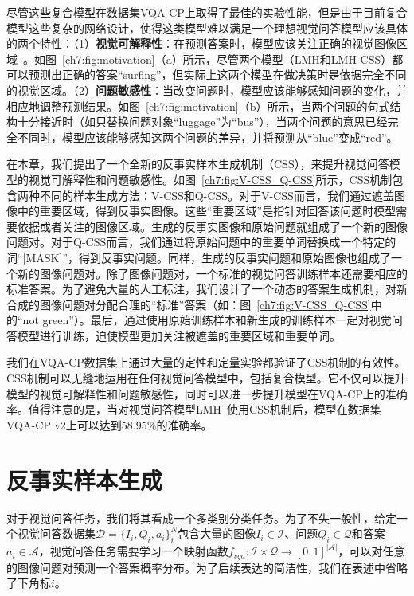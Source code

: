 尽管这些复合模型在数据集VQA-CP上取得了最佳的实验性能，但是由于目前复合模型这些复杂的网络设计，使得这类模型难以满足一个理想视觉问答模型应该具体的两个特性：（1）\textbf{视觉可解释性}：在预测答案时，模型应该关注正确的视觉图像区域~\cite{ross2017right}。如图~\ref{ch7:fig:motivation}（a）所示，尽管两个模型（LMH和LMH-CSS）都可以预测出正确的答案“surfing”，但实际上这两个模型在做决策时是依据完全不同的视觉区域。（2）\textbf{问题敏感性}：当改变问题时，模型应该能够感知问题的变化，并相应地调整预测结果。如图~\ref{ch7:fig:motivation}（b）所示，当两个问题的句式结构十分接近时（如只替换问题对象“luggage”为“bus”），当两个问题的意思已经完全不同时，模型应该能够感知这两个问题的差异，并将预测从“blue”变成“red”。

在本章，我们提出了一个全新的反事实样本生成机制（CSS），来提升视觉问答模型的视觉可解释性和问题敏感性。如图~\ref{ch7:fig:V-CSS_Q-CSS}所示，CSS机制包含两种不同的样本生成方法：V-CSS和Q-CSS。对于V-CSS而言，我们通过遮盖图像中的重要区域，得到反事实图像。这些“重要区域”是指针对回答该问题时模型需要依据或者关注的图像区域。生成的反事实图像和原始问题就组成了一个新的图像问题对。对于Q-CSS而言，我们通过将原始问题中的重要单词替换成一个特定的词“[MASK]”，得到反事实问题。同样，生成的反事实问题和原始图像也组成了一个新的图像问题对。除了图像问题对，一个标准的视觉问答训练样本还需要相应的标准答案。为了避免大量的人工标注，我们设计了一个动态的答案生成机制，对新合成的图像问题对分配合理的“标准”答案（如：图~\ref{ch7:fig:V-CSS_Q-CSS}中的“not green”）。最后，通过使用原始训练样本和新生成的训练样本一起对视觉问答模型进行训练，迫使模型更加关注被遮盖的重要区域和重要单词。

我们在VQA-CP数据集上通过大量的定性和定量实验都验证了CSS机制的有效性。CSS机制可以无缝地运用在任何视觉问答模型中，包括复合模型。它不仅可以提升模型的视觉可解释性和问题敏感性，同时可以进一步提升模型在VQA-CP上的准确率。值得注意的是，当对视觉问答模型LMH~\cite{clark2019don}使用CSS机制后，模型在数据集VQA-CP v2上可以达到58.95\%的准确率。


\section{反事实样本生成}

对于视觉问答任务，我们将其看成一个多类别分类任务。为了不失一般性，给定一个视觉问答数据集$\mathcal{D} = \{I_i, Q_i, a_i \}^N_i$包含大量的图像$I_i \in \mathcal{I}$、问题$Q_i \in \mathcal{Q}$和答案$a_i \in \mathcal{A}$，视觉问答任务需要学习一个映射函数$f_{vqa}: \mathcal{I} \times \mathcal{Q} \rightarrow [0, 1]^{|\mathcal{A}|}$，可以对任意的图像问题对预测一个答案概率分布。为了后续表达的简洁性，我们在表述中省略了下角标$i$。

